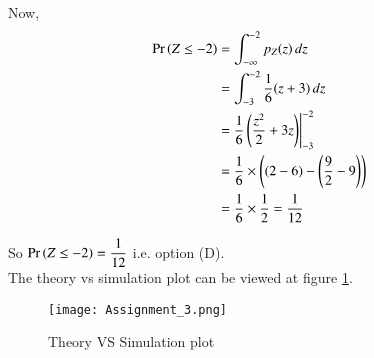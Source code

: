 \documentclass[journal,12pt,twocolumn]{IEEEtran}
\begin{document}
Now,
\begin{align}
    \Pr\left(Z\le -2\right) &=  \int_{-\infty}^{-2}p_{Z}(z) \,dz  \\
          &=  \int_{-3}^{-2} \dfrac{1}{6}(z+3) \,dz  \\
          &= \dfrac{1}{6} \left(\dfrac{z^2}{2}+3z \right) \Biggr|_{-3}^{-2}  \\
          &=  \dfrac{1}{6} \times \left((2-6) - \left(\dfrac{9}{2} -9 \right)\right) \\
          &= \dfrac{1}{6} \times \dfrac{1}{2}  =\dfrac{1}{12}
\end{align}

So $\Pr\left( Z \leq -2\right)=  \dfrac{1}{12}$ i.e. option (D). \\
The theory vs simulation plot can be viewed at figure \ref{Theory VS simulation plot}. 

\begin{figure}[h!]
       \centering
    \texttt{[image: Assignment\_3.png]}
    \caption{Theory VS Simulation plot}
    \label{Theory VS simulation plot}
\end{figure}
\end{document}
